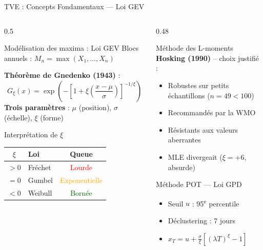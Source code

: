 \documentclass[aspectratio=169, 9pt]{beamer}
\begin{document}
\begin{frame}{TVE : Concepts Fondamentaux --- Loi GEV}
\begin{columns}[T]
\begin{column}{0.5\textwidth}
  \begin{block}{Modélisation des maxima : Loi GEV}
  \small
    Blocs annuels : $M_n = \max(X_1, \ldots, X_n)$
    \vspace{0.2cm}

    \textbf{Théorème de Gnedenko (1943)} :
    \begin{equation*}
      G_\xi(x) = \exp\!\left(-\!\left[1 +
      \xi\!\left(\frac{x-\mu}{\sigma}
      \right)\right]^{-1/\xi}\right)
    \end{equation*}
    \textbf{Trois paramètres} :
    $\mu$ (position), $\sigma$ (échelle),
    $\xi$ (forme)
  \end{block}
  \vspace{0.1cm}
  \begin{block}{Interprétation de $\xi$}
  \small
    \begin{tabular}{clc}
      \toprule
      \textbf{$\xi$} & \textbf{Loi} &
      \textbf{Queue} \\
      \midrule
      $> 0$ & Fréchet & \textcolor{red}{Lourde} \\
      $= 0$ & Gumbel  & \textcolor{orange}{Exponentielle} \\
      $< 0$ & Weibull & \textcolor{darkgreen}{Bornée} \\
      \bottomrule
    \end{tabular}
  \end{block}
\end{column}
\begin{column}{0.48\textwidth}
  \begin{block}{Méthode des L-moments}
  \small
    \textbf{Hosking (1990)} -- choix justifié :
    \begin{itemize}
      \item Robustes sur petits échantillons
            ($n=49 < 100$)
      \item Recommandés par la WMO
      \item Résistants aux valeurs aberrantes
      \item MLE divergeait ($\xi = +6$, absurde)
    \end{itemize}
  \end{block}
  \vspace{0.1cm}
  \begin{block}{Méthode POT --- Loi GPD}
  \small
    \begin{itemize}
      \item Seuil $u$ : 95\textsuperscript{e} percentile
      \item Déclustering : 7 jours
      \item $x_T = u + \frac{\sigma}{\xi}
            \left[(\lambda T)^\xi - 1\right]$
    \end{itemize}
  \end{block}
\end{column}
\end{columns}
\end{frame}
\end{document}
